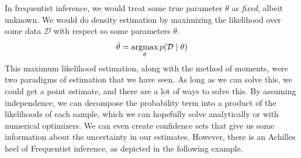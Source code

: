In frequentist inference, we would treat some true parameter $\theta$ as \textit{fixed}, albeit unknown. We would do density estimation by maximizing the likelihood over some data $\mathcal{D}$ with respect so some parameters $\theta$. 
\begin{equation}
  \hat{\theta} = \operatorname*{\arg\!\max}_{\theta} p(\mathcal{D} \mid \theta)
\end{equation}
This maximum likelihood estimation, along with the method of moments, were two paradigms of estimation that we have seen. As long as we can solve this, we could get a point estimate, and there are a lot of ways to solve this. By assuming independence, we can decompose the probability term into a product of the likelihoods of each sample, which we can hopefully solve analytically or with numerical optimizers. We can even create confidence sets that give us some information about the uncertainty in our estimates. However, there is an Achilles heel of Frequentist inference, as depicted in the following example. 

